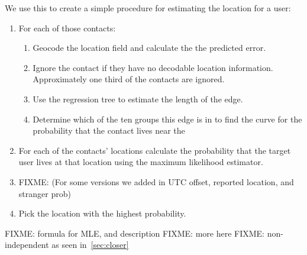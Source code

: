 We use this to create a simple procedure for estimating the location for a user:
\begin{enumerate}
\item For each of those contacts:
\begin{enumerate}
    \item Geocode the location field and calculate the the predicted error.
    \item Ignore the contact if they have no decodable location information.
    Approximately one third of the contacts are ignored.
    \item Use the regression tree to estimate the length of the edge.
    \item Determine which of the ten groups this edge is in to find the curve
        for the probability that the contact lives near the
\end{enumerate}
\item For each of the contacts' locations calculate the probability that the
target user lives at that location using the maximum likelihood estimator.
\item FIXME: (For some versions we added in UTC offset, reported location, and stranger prob)
\item Pick the location with the highest probability.
\end{enumerate}

FIXME: formula for MLE, and description
FIXME: more here
FIXME: non-independent as seen in~\ref{sec:closer}

